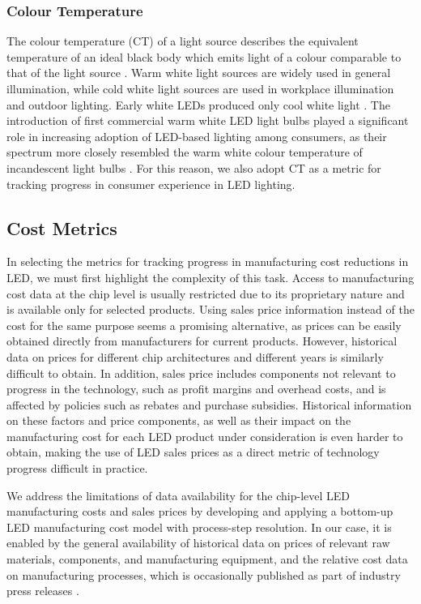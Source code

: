 \documentclass[parskip=full]{article}
\begin{document}
\subsubsection{Colour Temperature}

The colour temperature (CT) of a light source describes the equivalent temperature of an ideal black body which emits light of a colour comparable to that of the light source \cite{commission2011cie}. Warm white light sources are widely used in general illumination, while cold white light sources are used in workplace illumination and outdoor lighting. Early white LEDs produced only cool white light \cite{mueller2000light}. The introduction of first commercial warm white LED light bulbs played a significant role in increasing adoption of LED-based lighting among consumers, as their spectrum more closely resembled the warm white colour temperature of incandescent light bulbs \cite{al2016optics}. For this reason, we also adopt CT as a metric for tracking progress in consumer experience in LED lighting.

\subsection{Cost Metrics}

In selecting the metrics for tracking progress in manufacturing cost reductions in LED, we must first highlight the complexity of this task. Access to manufacturing cost data at the chip level is usually restricted due to its proprietary nature and is available only for selected products. Using sales price information instead of the cost for the same purpose seems a promising alternative, as prices can be easily obtained directly from manufacturers for current products. However, historical data on prices for different chip architectures and different years is similarly difficult to obtain. In addition, sales price includes components not relevant to progress in the technology, such as profit margins and overhead costs, and is affected by policies such as rebates and purchase subsidies. Historical information on these factors and price components, as well as their impact on the manufacturing cost for each LED product under consideration is even harder to obtain, making the use of LED sales prices as a direct metric of technology progress difficult in practice.

We address the limitations of data availability for the chip-level LED manufacturing costs and sales prices by developing and applying a bottom-up LED manufacturing cost model with process-step resolution. In our case, it is enabled by the general availability of historical data on prices of relevant raw materials, components, and manufacturing equipment, and the relative cost data on manufacturing processes, which is occasionally published as part of industry press releases \cite{ledinside2013csp}\cite{seoul2015csp}. 
\end{document}
